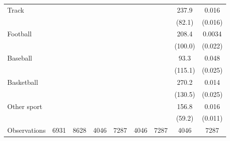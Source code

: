 \begin{tabular}{l*{8}{c}}
\addlinespace
Track               &            &            &            &            &            &            &       237.9&       0.016\\
                    &            &            &            &            &            &            &      (82.1)&     (0.016)\\
\addlinespace
Football            &            &            &            &            &            &            &       208.4&      0.0034\\
                    &            &            &            &            &            &            &     (100.0)&     (0.022)\\
\addlinespace
Baseball            &            &            &            &            &            &            &        93.3&       0.048\\
                    &            &            &            &            &            &            &     (115.1)&     (0.025)\\
\addlinespace
Basketball          &            &            &            &            &            &            &       270.2&       0.014\\
                    &            &            &            &            &            &            &     (130.5)&     (0.025)\\
\addlinespace
Other sport         &            &            &            &            &            &            &       156.8&       0.016\\
                    &            &            &            &            &            &            &      (59.2)&     (0.011)\\
\midrule
Observations        &        6931&        8628&        4046&        7287&        4046&        7287&        4046&        7287\\
\bottomrule
\end{tabular}

